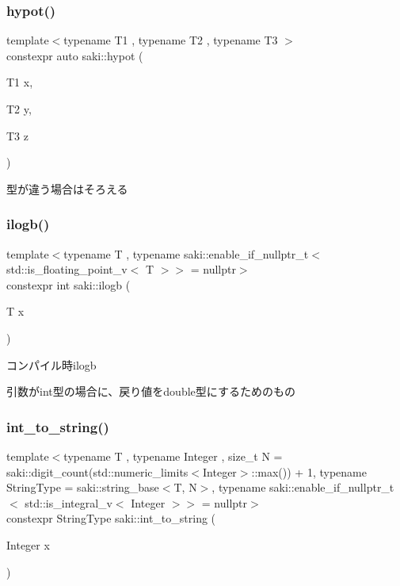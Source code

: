 \subsubsection{\texorpdfstring{hypot()}{hypot()}\hspace{0.1cm}{\footnotesize\ttfamily [6/6]}}
{\footnotesize\ttfamily template$<$typename T1 , typename T2 , typename T3 $>$ \\
constexpr auto saki\+::hypot (\begin{DoxyParamCaption}\item[{T1}]{x,  }\item[{T2}]{y,  }\item[{T3}]{z }\end{DoxyParamCaption})}



型が違う場合はそろえる 

\mbox{\label{namespacesaki_a582e9de82aa8572287c01530ae2626a8}} 
\subsubsection{\texorpdfstring{ilogb()}{ilogb()}}
{\footnotesize\ttfamily template$<$typename T , typename saki\+::enable\+\_\+if\+\_\+nullptr\+\_\+t$<$ std\+::is\+\_\+floating\+\_\+point\+\_\+v$<$ T $>$$>$  = nullptr$>$ \\
constexpr int saki\+::ilogb (\begin{DoxyParamCaption}\item[{T}]{x }\end{DoxyParamCaption})}



コンパイル時ilogb 

引数がint型の場合に、戻り値をdouble型にするためのもの \mbox{\label{namespacesaki_a52a09941a80893dfdea6da4c220fba08}} 
\subsubsection{\texorpdfstring{int\+\_\+to\+\_\+string()}{int\_to\_string()}}
{\footnotesize\ttfamily template$<$typename T , typename Integer , size\+\_\+t N = saki\+::digit\+\_\+count(std\+::numeric\+\_\+limits$<$\+Integer$>$\+::max()) + 1, typename String\+Type  = saki\+::string\+\_\+base$<$\+T, N$>$, typename saki\+::enable\+\_\+if\+\_\+nullptr\+\_\+t$<$ std\+::is\+\_\+integral\+\_\+v$<$ Integer $>$$>$  = nullptr$>$ \\
constexpr String\+Type saki\+::int\+\_\+to\+\_\+string (\begin{DoxyParamCaption}\item[{Integer}]{x }\end{DoxyParamCaption})}




